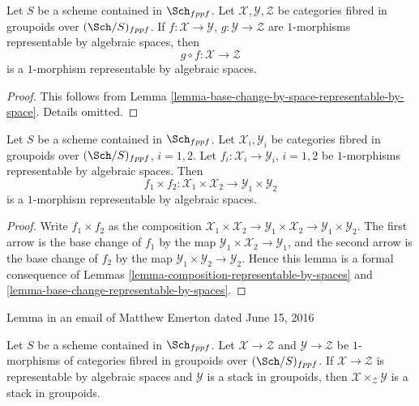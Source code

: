 \begin{lemma}
\label{lemma-composition-representable-by-spaces}
Let $S$ be a scheme contained in $\Sch_{fppf}$.
Let $\mathcal{X}, \mathcal{Y}, \mathcal{Z}$
be categories fibred in groupoids over $(\Sch/S)_{fppf}$.
If $f : \mathcal{X} \to \mathcal{Y}$, $g : \mathcal{Y} \to \mathcal{Z}$
are $1$-morphisms representable by algebraic spaces, then
$$
g \circ f : \mathcal{X} \longrightarrow \mathcal{Z}
$$
is a $1$-morphism representable by algebraic spaces.
\end{lemma}

\begin{proof}
This follows from
Lemma \ref{lemma-base-change-by-space-representable-by-space}.
Details omitted.
\end{proof}

\begin{lemma}
\label{lemma-product-representable-by-spaces}
Let $S$ be a scheme contained in $\Sch_{fppf}$.
Let $\mathcal{X}_i, \mathcal{Y}_i$ be categories fibred in groupoids over
$(\Sch/S)_{fppf}$, $i = 1, 2$.
Let $f_i : \mathcal{X}_i \to \mathcal{Y}_i$, $i = 1, 2$
be $1$-morphisms representable by algebraic spaces.
Then
$$
f_1 \times f_2 :
\mathcal{X}_1 \times \mathcal{X}_2
\longrightarrow
\mathcal{Y}_1 \times \mathcal{Y}_2
$$
is a $1$-morphism representable by algebraic spaces.
\end{lemma}

\begin{proof}
Write $f_1 \times f_2$ as the composition
$\mathcal{X}_1 \times \mathcal{X}_2 \to
\mathcal{Y}_1 \times \mathcal{X}_2 \to
\mathcal{Y}_1 \times \mathcal{Y}_2$.
The first arrow is the base change of $f_1$ by the map
$\mathcal{Y}_1 \times \mathcal{X}_2 \to \mathcal{Y}_1$, and the second arrow
is the base change of $f_2$ by the map
$\mathcal{Y}_1 \times \mathcal{Y}_2 \to \mathcal{Y}_2$.
Hence this lemma is a formal
consequence of Lemmas \ref{lemma-composition-representable-by-spaces}
and \ref{lemma-base-change-representable-by-spaces}.
\end{proof}

\begin{lemma}
\label{lemma-get-a-stack}
\begin{reference}
Lemma in an email of Matthew Emerton dated June 15, 2016
\end{reference}
Let $S$ be a scheme contained in $\Sch_{fppf}$.
Let $\mathcal{X} \to \mathcal{Z}$ and $\mathcal{Y} \to \mathcal{Z}$
be $1$-morphisms of categories fibred in groupoids over $(\Sch/S)_{fppf}$.
If $\mathcal{X} \to \mathcal{Z}$ is representable by algebraic spaces
and $\mathcal{Y}$ is a stack in groupoids, then
$\mathcal{X} \times_\mathcal{Z} \mathcal{Y}$ is a stack in groupoids.
\end{lemma}

